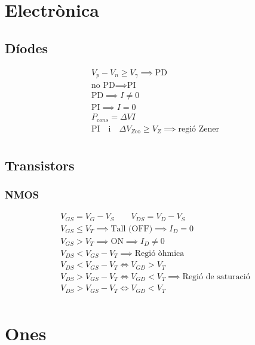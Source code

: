 \documentclass[10pt,twocolumn]{article}
\begin{document}
\section{Electrònica}
\subsection{Díodes}
\begin{gather*}
V_p - V_n \geq V_\gamma \implies \text{PD} \\
\text{no PD} \implies \text{PI} \\
\text{PD} \implies I \neq 0 \\
\text{PI} \implies I = 0 \\
P_{cons} = \Delta V I \\
\text{PI} \quad \text{i} \quad \Delta V_{Z \text{co}} \geq V_Z \implies \text{regió Zener}  \\
\end{gather*}
\subsection{Transistors}
\subsubsection{NMOS}
\begin{gather*}
V_{GS} = V_G - V_S \qquad V_{DS} = V_D - V_S \\
V_{GS} \leq V_T \implies \text{Tall (OFF)} \implies I_D = 0 \\
V_{GS} > V_T \implies \text{ON} \implies I_D \neq 0  \\
V_{DS} < V_{GS} - V_T \implies \text{Regió òhmica} \\
V_{DS} < V_{GS} - V_T \iff V_{GD} > V_T \\
V_{DS} > V_{GS} - V_T \iff V_{GD} < V_T \implies \text{Regió de saturació} \\
V_{DS} > V_{GS} - V_T \iff V_{GD} < V_T \\
\end{gather*}
\section{Ones}
\end{document}
